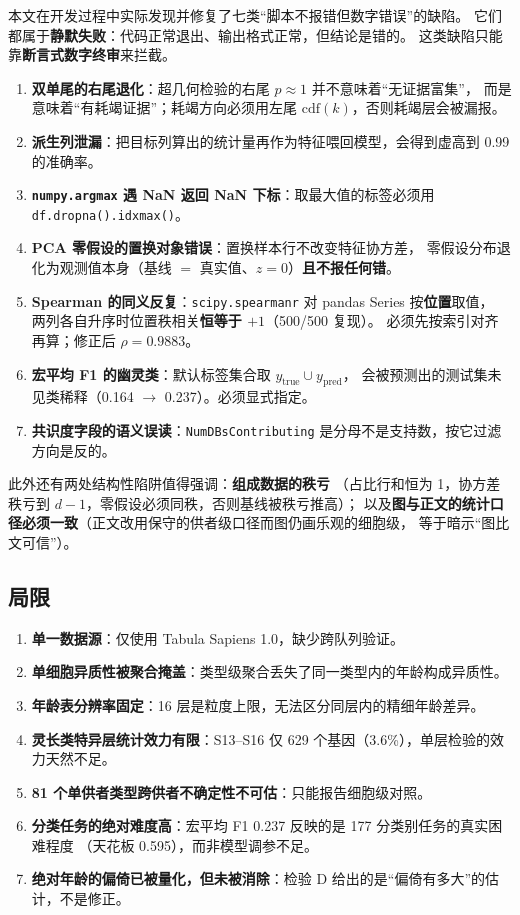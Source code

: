 \documentclass[numsec,webpdf,modern,large]{oup-authoring-template}
\newcommand{\code}[1]{\texttt{\small #1}}
\begin{document}
本文在开发过程中实际发现并修复了七类“脚本不报错但数字错误”的缺陷。
它们都属于\textbf{静默失败}：代码正常退出、输出格式正常，但结论是错的。
这类缺陷只能靠\textbf{断言式数字终审}来拦截。

\begin{enumerate}[label=(\arabic*)]
  \item \textbf{双单尾的右尾退化}：超几何检验的右尾 $p \approx 1$ 并不意味着“无证据富集”，
        而是意味着“有耗竭证据”；耗竭方向必须用左尾 $\mathrm{cdf}(k)$，否则耗竭层会被漏报。
  \item \textbf{派生列泄漏}：把目标列算出的统计量再作为特征喂回模型，会得到虚高到 0.99 的准确率。
  \item \textbf{\texttt{numpy.argmax} 遇 NaN 返回 NaN 下标}：取最大值的标签必须用
        \code{df.dropna().idxmax()}。
  \item \textbf{PCA 零假设的置换对象错误}：置换样本行不改变特征协方差，
        零假设分布退化为观测值本身（基线 $=$ 真实值、$z = 0$）\textbf{且不报任何错}。
  \item \textbf{Spearman 的同义反复}：\texttt{scipy.spearmanr} 对 pandas Series 按\textbf{位置}取值，
        两列各自升序时位置秩相关\textbf{恒等于 $+1$}（500/500 复现）。
        必须先按索引对齐再算；修正后 $\rho = 0.9883$。
  \item \textbf{宏平均 F1 的幽灵类}：默认标签集合取 $y_{\text{true}} \cup y_{\text{pred}}$，
        会被预测出的测试集未见类稀释（0.164 $\to$ 0.237）。必须显式指定。
  \item \textbf{共识度字段的语义误读}：\texttt{NumDBsContributing} 是分母不是支持数，按它过滤方向是反的。
\end{enumerate}

此外还有两处结构性陷阱值得强调：\textbf{组成数据的秩亏}
（占比行和恒为 1，协方差秩亏到 $d-1$，零假设必须同秩，否则基线被秩亏推高）；
以及\textbf{图与正文的统计口径必须一致}（正文改用保守的供者级口径而图仍画乐观的细胞级，
等于暗示“图比文可信”）。

\subsection{局限}

\begin{enumerate}[label=(\arabic*)]
  \item \textbf{单一数据源}：仅使用 Tabula Sapiens 1.0，缺少跨队列验证。
  \item \textbf{单细胞异质性被聚合掩盖}：类型级聚合丢失了同一类型内的年龄构成异质性。
  \item \textbf{年龄表分辨率固定}：16 层是粒度上限，无法区分同层内的精细年龄差异。
  \item \textbf{灵长类特异层统计效力有限}：S13--S16 仅 629 个基因（3.6\%），单层检验的效力天然不足。
  \item \textbf{81 个单供者类型跨供者不确定性不可估}：只能报告细胞级对照。
  \item \textbf{分类任务的绝对难度高}：宏平均 F1 0.237 反映的是 177 分类别任务的真实困难程度
        （天花板 0.595），而非模型调参不足。
  \item \textbf{绝对年龄的偏倚已被量化，但未被消除}：检验 D 给出的是“偏倚有多大”的估计，不是修正。
\end{enumerate}
\end{document}
